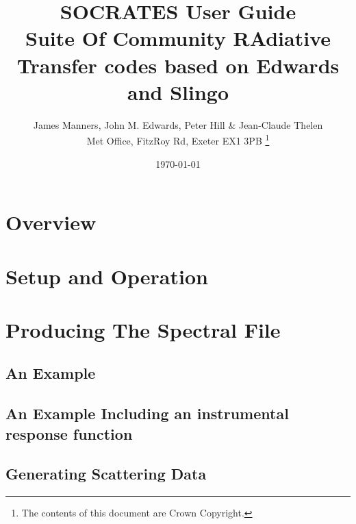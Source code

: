 \documentclass[11pt,a4paper,english,twoside,openany]{book}
\begin{document}

\pagestyle{empty}

\newcommand{\um}{$\mu$m}

\newcommand{\bx}{\mathbf{x}}
\newcommand{\bn}{\mathbf{n}}
\newcommand{\bnp}{\mathbf{n}'}

\title{SOCRATES User Guide\\
Suite Of Community RAdiative Transfer codes based on Edwards and Slingo}
\date{\today}

\author{James Manners, John M. Edwards, Peter Hill \& Jean-Claude Thelen\\
Met Office, FitzRoy Rd, Exeter EX1 3PB
\thanks{
 The contents of this document are Crown Copyright.
}}
\maketitle

\tableofcontents

\clearpage

\pagestyle{fancy}
\latex{
\fancyhf{}
\fancyhead[LE,RO]{\thepage}
\fancyhead[LO]{\nouppercase{\rightmark}}
\fancyhead[RE]{\nouppercase{\leftmark}}
}

\chapter{Overview}


\chapter{Setup and Operation}


\chapter{Producing The Spectral File}

\section{An Example}

\section{An Example Including an instrumental response function}

\section{Generating Scattering Data}

\end{document}
